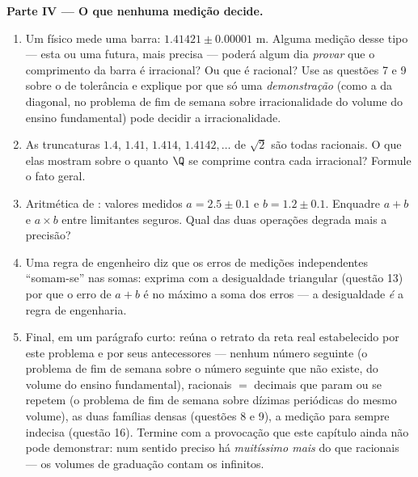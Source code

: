 \begin{problem}
\medskip
\noindent\textbf{Parte IV --- O que nenhuma medição decide.}
\begin{enumerate}[resume]
  \item Um físico mede uma barra: $1.41421 \pm 0.00001$ m.
        Alguma medição desse tipo --- esta ou uma futura, mais
        precisa --- poderá algum dia \emph{provar} que o
        comprimento da barra é irracional? Ou que é racional? Use
        as questões 7 e 9 sobre o  de tolerância e
        explique por que só uma \emph{demonstração} (como a da
        diagonal, no problema de fim de semana sobre
        irracionalidade do volume do ensino fundamental) pode
        decidir a irracionalidade.
  \item As truncaturas $1.4$, $1.41$, $1.414$, $1.4142,\dots$
        de $\sqrt2$ são todas racionais. O que elas mostram sobre
        o quanto $\Q$ se comprime contra cada irracional?
        Formule o fato geral.
  \item Aritmética de : valores medidos
        $a = 2.5 \pm 0.1$ e $b = 1.2 \pm 0.1$. Enquadre $a + b$ e
        $a \times b$ entre limitantes seguros. Qual das duas
        operações degrada mais a precisão?
  \item Uma regra de engenheiro diz que os erros de medições
        independentes ``somam-se'' nas somas: exprima com a
        desigualdade triangular (questão 13) por que o erro de
        $a + b$ é no máximo a soma dos erros --- a desigualdade
        \emph{é} a regra de engenharia.
  \item Final, em um parágrafo curto: reúna o retrato da reta
        real estabelecido por este problema e por seus
        antecessores --- nenhum número seguinte (o problema de
        fim de semana sobre o número seguinte que não existe, do
        volume do ensino fundamental), racionais $=$ decimais
        que param ou se repetem (o problema de fim de semana
        sobre dízimas periódicas do mesmo volume), as duas
        famílias densas (questões 8 e 9), a medição para sempre
        indecisa (questão 16). Termine com a provocação que este
        capítulo ainda não pode demonstrar: num sentido preciso
        há \emph{muitíssimo mais}  do que racionais
        --- os volumes de graduação contam os infinitos.
\end{enumerate}
\end{problem}
